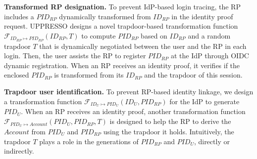 \vspace{0.5mm}
\noindent \textbf{Transformed RP designation.} To prevent IdP-based login tracing, the RP includes a $PID_{RP}$ dynamically transformed from $ID_{RP}$ in the identity proof request. UPPRESSO designs a novel trapdoor-based transformation function $\mathcal{F}_{ID_{RP} \mapsto PID_{RP}}(ID_{RP}, T)$ to compute $PID_{RP}$ based on $ID_{RP}$ and a random trapdoor $T$ that is dynamically negotiated between the user and the RP in each login. Then, the user assists the RP to register $PID_{RP}$ at the IdP through OIDC dynamic registration. When an RP receives an identity proof, it verifies if the enclosed $PID_{RP}$ is transformed from its $ID_{RP}$ and the trapdoor of this session.



\noindent \textbf{Trapdoor user identification.} To prevent RP-based identity linkage, we design a transformation function $\mathcal{F}_{ID_{U} \mapsto PID_U}(ID_U, PID_{RP})$ for the IdP to generate $PID_U$. When an RP receives an identity proof, another transformation function $\mathcal{F}_{PID_{U} \mapsto Account}(PID_U, PID_{RP}, T)$ is designed to help the RP to derive the $Account$ from $PID_U$ and $PID_{RP}$ using the trapdoor it holds. Intuitively, the trapdoor $T$ plays a role in the generations of $PID_{RP}$ and $PID_U$, directly or indirectly.


